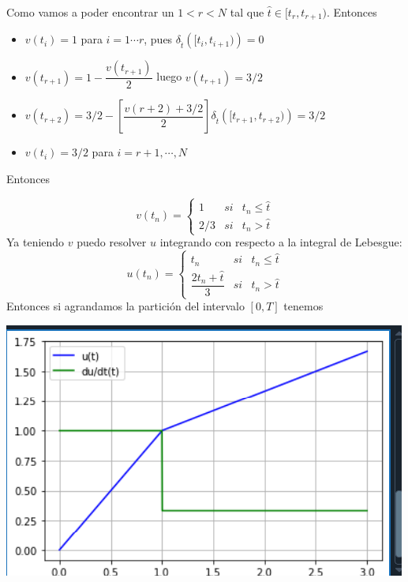 \begin{example}
Como vamos a poder encontrar un $1<r<N$ tal que $\hat{t}\in [t_r,t_{r+1})$. Entonces
\begin{itemize}
	\item  $v(t_i)=1$ para $i=1\cdots r$, pues $\delta_{\hat{t}}\left( [t_i,t_{i+1})\right)=0$
	\item $v(t_{r+1})=1-\dfrac{v(t_{r+1})}{2}$ luego $v(t_{r+1})=3/2$
	
	\item$v(t_{r+2})=3/2-\left[ \dfrac{v(r+2)+3/2}{2}\right]\delta_{\hat{t}}\left( [t_{r+1},t_{r+2})\right)=3/2$
	\item $v(t_i)=3/2$ para $i=r+1, \cdots ,N$
\end{itemize}
Entonces


\begin{equation*}
	v(t_n)=\left\lbrace \begin{array}{lcr}
		1 & si & t_n\leq \hat{t}\\
		2/3 & si & t_n> \hat{t}
	\end{array}\right. 
\end{equation*} 
Ya teniendo $v$ puedo resolver $u$ integrando con respecto a la integral de Lebesgue:
\begin{equation*}
	u(t_n)=\left\lbrace \begin{array}{lcr}
		t_n & si & t_n\leq \hat{t}\\
		\dfrac{2t_n+\hat{t}}{3} & si & t_n> \hat{t}
	\end{array}\right. 
\end{equation*} 
Entonces si agrandamos la partición del intervalo $[0,T]$ tenemos 
\begin{center}
\includegraphics[width=0.7\linewidth]{fig4}
\end{center}
\end{example}
 
 
